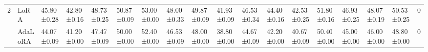 \begin{table*}[]
\begin{scriptsize}
{\begin{tabular}{c|l|l|l|l|l|l|l|l|l|l|l|l|l|l|l|l|c}
\multirow{5}{*}{2}  & LoRA                                   & 45.80±0.28                        & 42.80±0.16                        & 48.73±0.25                       & 50.87±0.09                       & 53.00±0.00                        & 48.00±0.33                        & 49.87±0.09                       & 41.93±0.09                       & 46.53±0.34                       & 44.40±0.16                        & 42.53±0.25                       & 51.80±0.16                        & 46.93±0.25                       & 48.07±0.19                       & 50.53±0.25                       & 0             \\ %
                    & AdaLoRA                              & 44.07±0.09                       & 41.20±0.00                        & 47.47±0.09                       & 50.00±0.00                        & 52.40±0.00                        & 46.53±0.09                       & 48.00±0.00                        & 38.80±0.00                        & 44.67±0.09                       & 42.20±0.00                        & 40.67±0.09                       & 50.40±0.00                        & 45.00±0.00                        & 46.00±0.00                        & 48.80±0.00                        & 0             \\ %

\end{tabular}}
\end{scriptsize}
\end{table*}
